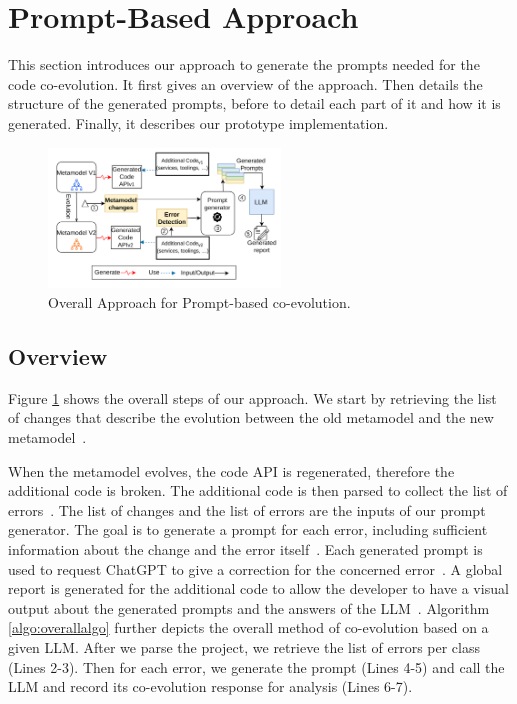 \section{Prompt-Based Approach}
\label{appraoch}
This section introduces our approach to generate the prompts needed for the code co-evolution. 
It first gives an overview of the approach. Then details the structure of the generated prompts, before to detail each part of it and how it is generated. Finally, it describes our prototype implementation.  

\begin{figure}
	\centering
	\hspace*{-0.8cm}
	\includegraphics[width=0.55\textwidth]{./pics/chapter3pics/approach.png}
	\caption{Overall Approach for Prompt-based co-evolution.}
	\label{fig: approach}
\end{figure}



\subsection{Overview}

Figure \ref{fig: approach} shows the overall steps of our approach. We start by retrieving the list of changes that describe the evolution between the old metamodel and the new metamodel~. 

When the metamodel evolves, the code API is regenerated, therefore the additional code is broken. The additional code is then parsed to collect the list of errors~. The list of changes and the list of errors are the inputs of our prompt generator. The goal is to generate a prompt for each error, including sufficient information about the change and the error itself~.
Each generated prompt is used to request ChatGPT to give a correction for the concerned error~. A global report is generated for the additional code to allow the developer to have a visual output about the generated prompts and the answers of the LLM~. Algorithm \ref{algo:overallalgo} further depicts the overall method of co-evolution based on a given LLM. After we parse the project, we retrieve the list of errors per class (Lines 2-3). Then for each error, we generate the prompt (Lines 4-5) and call the LLM and record its co-evolution response for analysis (Lines 6-7).


